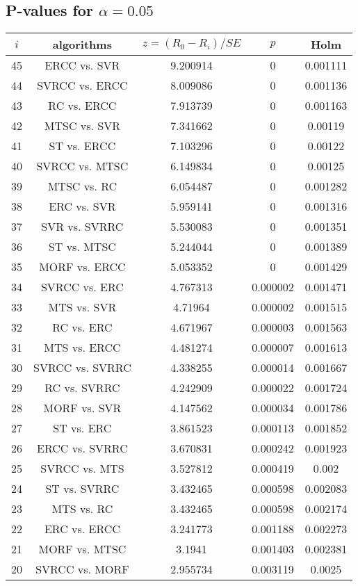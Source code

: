 \documentclass[a4paper,10pt]{article}
\begin{document}
\begin{landscape}
\subsection{P-values for $\alpha=0.05$}

\begin{table}[!htp]
\centering\scriptsize
\begin{tabular}{ccccc}
$i$&algorithms&$z=(R_0 - R_i)/SE$&$p$&Holm\\
\hline45&ERCC vs. SVR&9.200914&0&0.001111\\
44&SVRCC vs. ERCC&8.009086&0&0.001136\\
43&RC vs. ERCC&7.913739&0&0.001163\\
42&MTSC vs. SVR&7.341662&0&0.00119\\
41&ST vs. ERCC&7.103296&0&0.00122\\
40&SVRCC vs. MTSC&6.149834&0&0.00125\\
39&MTSC vs. RC&6.054487&0&0.001282\\
38&ERC vs. SVR&5.959141&0&0.001316\\
37&SVR vs. SVRRC&5.530083&0&0.001351\\
36&ST vs. MTSC&5.244044&0&0.001389\\
35&MORF vs. ERCC&5.053352&0&0.001429\\
34&SVRCC vs. ERC&4.767313&0.000002&0.001471\\
33&MTS vs. SVR&4.71964&0.000002&0.001515\\
32&RC vs. ERC&4.671967&0.000003&0.001563\\
31&MTS vs. ERCC&4.481274&0.000007&0.001613\\
30&SVRCC vs. SVRRC&4.338255&0.000014&0.001667\\
29&RC vs. SVRRC&4.242909&0.000022&0.001724\\
28&MORF vs. SVR&4.147562&0.000034&0.001786\\
27&ST vs. ERC&3.861523&0.000113&0.001852\\
26&ERCC vs. SVRRC&3.670831&0.000242&0.001923\\
25&SVRCC vs. MTS&3.527812&0.000419&0.002\\
24&ST vs. SVRRC&3.432465&0.000598&0.002083\\
23&MTS vs. RC&3.432465&0.000598&0.002174\\
22&ERC vs. ERCC&3.241773&0.001188&0.002273\\
21&MORF vs. MTSC&3.1941&0.001403&0.002381\\
20&SVRCC vs. MORF&2.955734&0.003119&0.0025\\

\end{tabular}
\end{table}
\end{landscape}
\end{document}
